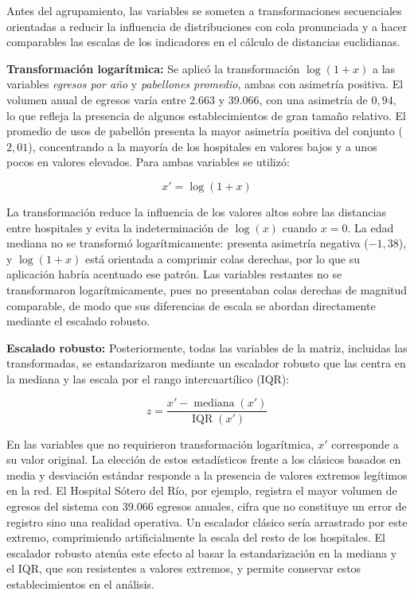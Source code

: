 Antes del agrupamiento, las variables se someten a transformaciones
secuenciales orientadas a reducir la influencia de distribuciones con cola
pronunciada y a hacer comparables las escalas de los indicadores en el cálculo
de distancias euclidianas.

\textbf{Transformación logarítmica:} Se aplicó la transformación $\log(1+x)$
a las variables \textit{egresos por año} y \textit{pabellones promedio}, ambas
con asimetría positiva. El volumen anual de egresos varía entre 2.663 y 39.066,
con una asimetría de $0{,}94$, lo que refleja la presencia de algunos
establecimientos de gran tamaño relativo. El promedio de usos de pabellón
presenta la mayor asimetría positiva del conjunto ($2{,}01$), concentrando a la
mayoría de los hospitales en valores bajos y a unos pocos en valores elevados.
Para ambas variables se utilizó:

\begin{equation}
x' = \log(1 + x)
\label{eq:log1p}
\end{equation}

La transformación reduce la influencia de los valores altos sobre las distancias
entre hospitales y evita la indeterminación de $\log(x)$ cuando $x = 0$. La edad
mediana no se transformó logarítmicamente: presenta asimetría negativa
($-1{,}38$), y $\log(1+x)$ está orientada a comprimir colas derechas, por lo que
su aplicación habría acentuado ese patrón. Las variables restantes no se
transformaron logarítmicamente, pues no presentaban colas derechas de magnitud
comparable, de modo que sus diferencias de escala se abordan directamente mediante el escalado robusto.

\textbf{Escalado robusto:} Posteriormente, todas las variables de la matriz,
incluidas las transformadas, se estandarizaron mediante un escalador robusto que
las centra en la mediana y las escala por el rango intercuartílico (IQR):

\begin{equation}
z = \frac{x' - \operatorname{mediana}(x')}{\operatorname{IQR}(x')}
\label{eq:robust}
\end{equation}

En las variables que no requirieron transformación logarítmica, $x'$ corresponde
a su valor original. La elección de estos estadísticos frente a los clásicos
basados en media y desviación estándar responde a la presencia de valores
extremos legítimos en la red. El Hospital Sótero del Río, por ejemplo, registra
el mayor volumen de egresos del sistema con 39.066 egresos anuales, cifra que no
constituye un error de registro sino una realidad operativa. Un escalador clásico
sería arrastrado por este extremo, comprimiendo artificialmente la escala del
resto de los hospitales. El escalador robusto atenúa este efecto al basar la
estandarización en la mediana y el IQR, que son resistentes a valores extremos,
y permite conservar estos establecimientos en el análisis.

